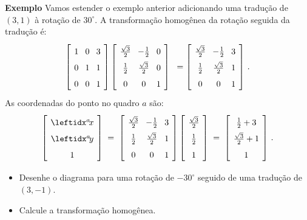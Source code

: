 \noindent\textbf{Exemplo} Vamos estender o exemplo anterior adicionando uma tradução de $(3,1)$ à rotação de $30^\circ$. A transformação homogênea da rotação seguida da tradução é:
\[
\spacearray
\left[\begin{array}{ccc}1&0&3\\0&1&1\\0&0&1\end{array}\right]
\left[\begin{array}{ccc}\frac{\sqrt{3}}{2}&-\frac{1}{2}&0\\\frac{1}{2}&\frac{\sqrt{3}}{2}&0\\0&0&1\end{array}\right]\;\;=
\left[\begin{array}{ccc}\frac{\sqrt{3}}{2}&-\frac{1}{2}&3\\\frac{1}{2}&\frac{\sqrt{3}}{2}&1\\0&0&1\end{array}\right]\,.
\]
As coordenadas do ponto no quadro $a$ são:
\[
\spacearray
\left[\begin{array}{c}\ax\\\ay\\1\end{array}\right]\;=\;
\left[\begin{array}{ccc}\frac{\sqrt{3}}{2}&-\frac{1}{2}&3\\\frac{1}{2}&\frac{\sqrt{3}}{2}&1\\0&0&1\end{array}\right]
\left[\begin{array}{c}\frac{\sqrt{3}}{2}\\\frac{1}{2}\\1\end{array}\right]\;=\;
\left[\begin{array}{c}\frac{1}{2}+3\\\frac{\sqrt{3}}{2}+1\\1\end{array}\right]\,.
\]

\begin{framed}

\begin{itemize}
\item Desenhe o diagrama para uma rotação de $-30^\circ$ seguido de uma tradução de $(3,-1)$.
\item Calcule a transformação homogênea.
\end{itemize}
\end{framed}

